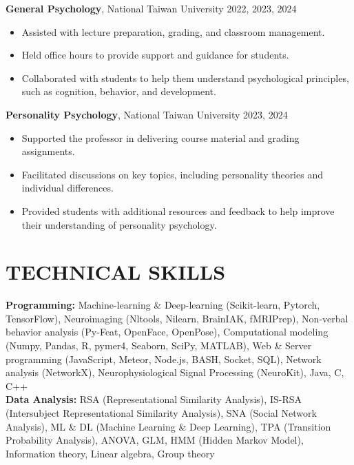 \documentclass[a4paper,12pt]{article}
\newcommand{\itemspace}{7pt} %
\begin{document}
\noindent\textbf{General Psychology}, National Taiwan University  \hfill 2022, 2023, 2024
\begin{itemize}
    \item Assisted with lecture preparation, grading, and classroom management.
    \item Held office hours to provide support and guidance for students.
    \item Collaborated with students to help them understand psychological principles, such as cognition, behavior, and development.
\end{itemize}

\noindent\textbf{Personality Psychology}, National Taiwan University \hfill 2023, 2024
\begin{itemize}
    \item Supported the professor in delivering course material and grading assignments.
    \item Facilitated discussions on key topics, including personality theories and individual differences.
    \item Provided students with additional resources and feedback to help improve their understanding of personality psychology.
\end{itemize}

\vspace{7pt}

\section*{TECHNICAL SKILLS}
\textbf{Programming:} Machine-learning \& Deep-learning (Scikit-learn, Pytorch, TensorFlow), Neuroimaging (Nltools, Nilearn, BrainIAK, fMRIPrep), Non-verbal behavior analysis (Py-Feat, OpenFace, OpenPose), Computational modeling (Numpy, Pandas, R, pymer4, Seaborn, SciPy, MATLAB), Web \& Server programming (JavaScript, Meteor, Node.js, BASH, Socket, SQL), Network analysis (NetworkX), Neurophysiological Signal Processing (NeuroKit), Java, C, C++ \\[\itemspace]
\noindent\textbf{Data Analysis:} RSA (Representational Similarity Analysis), IS-RSA (Intersubject Representational Similarity Analysis), SNA (Social Network Analysis), ML \& DL (Machine Learning \& Deep Learning), TPA (Transition Probability Analysis), ANOVA, GLM, HMM (Hidden Markov Model), Information theory, Linear algebra, Group theory

\thispagestyle{lastupdate}
\end{document}
